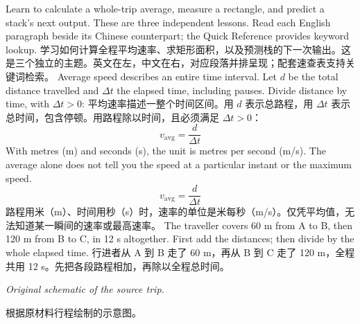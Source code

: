  {Learn to calculate a whole-trip average, measure a rectangle, and predict a stack's next output. These are three independent lessons. Read each English paragraph beside its Chinese counterpart; the Quick Reference provides keyword lookup.}
 {学习如何计算全程平均速率、求矩形面积，以及预测栈的下一次输出。这是三个独立的主题。英文在左，中文在右，对应段落并排呈现；配套速查表支持关键词检索。}
 {Average speed describes an entire time interval. Let $d$ be the total distance travelled and $\Delta t$ the elapsed time, including pauses. Divide distance by time, with $\Delta t>0$:}
 {平均速率描述一整个时间区间。用 $d$ 表示总路程，用 $\Delta t$ 表示总时间，包含停顿。用路程除以时间，且必须满足 $\Delta t>0$：}
 {\[v_{\mathrm{avg}}=\frac{d}{\Delta t}\] With metres (m) and seconds (s), the unit is metres per second (m/s). The average alone does not tell you the speed at a particular instant or the maximum speed.}
 {\[v_{\mathrm{avg}}=\frac{d}{\Delta t}\] 路程用米（m）、时间用秒（s）时，速率的单位是米每秒（m/s）。仅凭平均值，无法知道某一瞬间的速率或最高速率。}
 {The traveller covers 60 m from A to B, then 120 m from B to C, in 12 s altogether. First add the distances; then divide by the whole elapsed time.}
 {行进者从 A 到 B 走了 60 m，再从 B 到 C 走了 120 m，全程共用 12 s。先把各段路程相加，再除以全程总时间。}
 {\begin{center}\end{center}\textit{Original schematic of the source trip.}}
 {\begin{center}\end{center}根据原材料行程绘制的示意图。}
